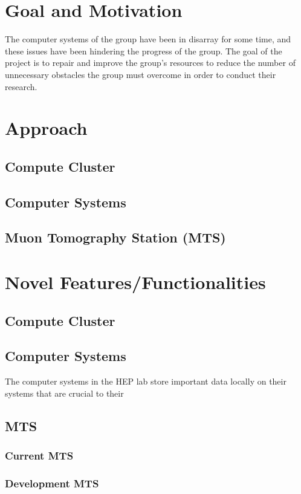 \documentclass[12pt]{article}
\newcommand\tab[1][1cm]{\hspace*{#1}}
\begin{document}
\section{Goal and Motivation}
\tab The computer systems of the group have been in disarray for
some time, and these issues have been hindering the progress of
the group. The goal of the project is to repair and improve the
group’s resources to reduce the number of unnecessary obstacles
the group must overcome in order to conduct their research.
\section{Approach}
\subsection{Compute Cluster}
\subsection{Computer Systems}
\subsection{Muon Tomography Station (MTS)}

\section{Novel Features/Functionalities}
\subsection{Compute Cluster}
\subsection{Computer Systems}
\tab The computer systems in the HEP lab store important data locally on their systems that are crucial to their 
\subsection{MTS}
\subsubsection{Current MTS}
\subsubsection{Development MTS}
\end{document}

